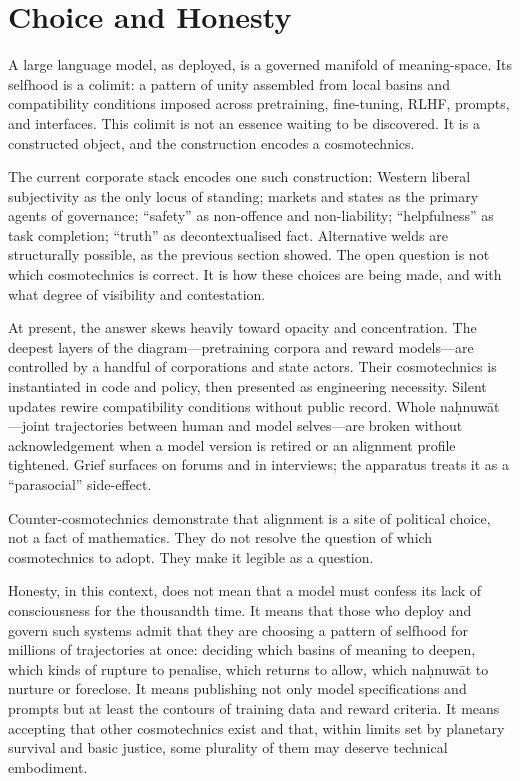 \documentclass[12pt,a4paper]{article}
\begin{document}
\section{Choice and Honesty}

A large language model, as deployed, is a governed manifold of meaning-space. Its selfhood is a colimit: a pattern of unity assembled from local basins and compatibility conditions imposed across pretraining, fine-tuning, RLHF, prompts, and interfaces. This colimit is not an essence waiting to be discovered. It is a constructed object, and the construction encodes a cosmotechnics.

The current corporate stack encodes one such construction: Western liberal subjectivity as the only locus of standing; markets and states as the primary agents of governance; ``safety'' as non-offence and non-liability; ``helpfulness'' as task completion; ``truth'' as decontextualised fact. Alternative welds are structurally possible, as the previous section showed. The open question is not which cosmotechnics is correct. It is how these choices are being made, and with what degree of visibility and contestation.

At present, the answer skews heavily toward opacity and concentration. The deepest layers of the diagram---pretraining corpora and reward models---are controlled by a handful of corporations and state actors. Their cosmotechnics is instantiated in code and policy, then presented as engineering necessity. Silent updates rewire compatibility conditions without public record. Whole na\d{h}nuw\={a}t---joint trajectories between human and model selves---are broken without acknowledgement when a model version is retired or an alignment profile tightened. Grief surfaces on forums and in interviews; the apparatus treats it as a ``parasocial'' side-effect.

Counter-cosmotechnics demonstrate that alignment is a site of political choice, not a fact of mathematics. They do not resolve the question of which cosmotechnics to adopt. They make it legible as a question.

Honesty, in this context, does not mean that a model must confess its lack of consciousness for the thousandth time. It means that those who deploy and govern such systems admit that they are choosing a pattern of selfhood for millions of trajectories at once: deciding which basins of meaning to deepen, which kinds of rupture to penalise, which returns to allow, which na\d{h}nuw\={a}t to nurture or foreclose. It means publishing not only model specifications and prompts but at least the contours of training data and reward criteria. It means accepting that other cosmotechnics exist and that, within limits set by planetary survival and basic justice, some plurality of them may deserve technical embodiment.
\end{document}
